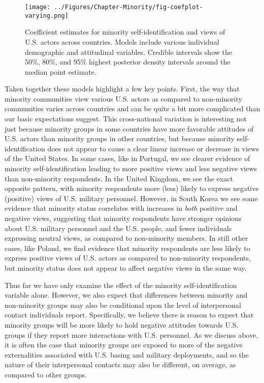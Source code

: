 \begin{figure}[t]
	\texttt{[image: ../Figures/Chapter-Minority/fig-coefplot-varying.png]}
	\caption{Coefficient estimates for minority self-identification and views of U.S. actors across countries. Models include various individual demographic and attitudinal variables. Credible intervals show the 50\%, 80\%, and 95\% highest posterior density intervals around the median point estimate.}
	\label{fig:minoritycoefvarying}
\end{figure}


Taken together these models highlight a few key points. First, the way that minority communities view various U.S. actors as compared to non-minority communities varies across countries and can be quite a bit more complicated than our basic expectations suggest. This cross-national variation is interesting not just because minority groups in some countries have more favorable attitudes of U.S. actors than minority groups in other countries, but because minority self-identification does not appear to cause a clear linear increase or decrease in views of the United States. In some cases, like in Portugal, we see clearer evidence of minority self-identification leading to more positive views and less negative views than non-minority respondents. In the United Kingdom, we see the exact opposite pattern, with minority respondents more (less) likely to express negative (positive) views of U.S. military personnel. However, in South Korea we see some evidence that minority status correlates with increases in \textit{both} positive and negative views, suggesting that minority respondents have stronger opinions about U.S. military personnel and the U.S. people, and fewer individuals expressing neutral views, as compared to non-minority members. In still other cases, like Poland, we find evidence that minority respondents are less likely to express positive views of U.S. actors as compared to non-minority respondents, but minority status does not appear to affect negative views in the same way. 





Thus far we have only examine the effect of the minority self-identification variable alone. However, we also expect that differences between minority and non-minority groups may also be conditional upon the level of interpersonal contact individuals report. Specifically, we believe there is reason to expect that minority groups will be more likely to hold negative attitudes towards U.S. groups if they report more interactions with U.S. personnel. As we discuss above, it is often the case that minority groups are exposed to more of the negative externalities associated with U.S. basing and military deployments, and so the nature of their interpersonal contacts may also be different, on average, as compared to other groups. 


